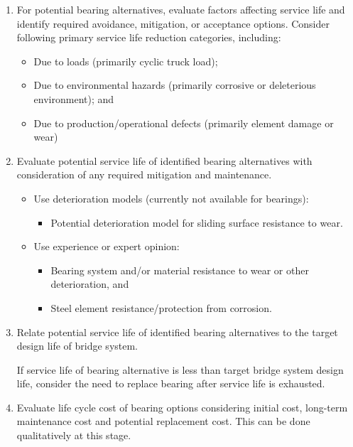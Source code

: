 \begin{enumerate}[label=步骤 3.\arabic*,itemindent=4em]
  \item For potential bearing alternatives, evaluate factors affecting service life and identify required avoidance, mitigation, or acceptance options. Consider following primary service life reduction categories, including:
  \begin{itemize}
    \item Due to loads (primarily cyclic truck load);
    \item Due to environmental hazards (primarily corrosive or deleterious environment); and
    \item Due to production/operational defects (primarily element damage or wear)
  \end{itemize}
  \item Evaluate potential service life of identified bearing alternatives with consideration of any required mitigation and maintenance.
  \begin{itemize}
    \item Use deterioration models (currently not available for bearings):
    \begin{itemize}
      \item Potential deterioration model for sliding surface resistance to wear.
    \end{itemize}
    \item Use experience or expert opinion:
    \begin{itemize}
      \item Bearing system and/or material resistance to wear or other deterioration, and
      \item Steel element resistance/protection from corrosion.
    \end{itemize}
  \end{itemize}

  \item Relate potential service life of identified bearing alternatives to the target design life of bridge system.
  
  If service life of bearing alternative is less than target bridge system design life, consider the need to replace bearing after service life is exhausted.
  \item Evaluate life cycle cost of bearing options considering initial cost, long-term maintenance cost and potential replacement cost. This can be done qualitatively at this stage.
\end{enumerate}



